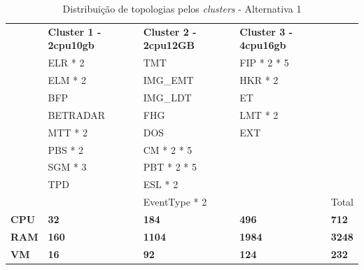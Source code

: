 \begin{table}[h!]
  \centering
  \begin{tabular}{|l|l|l|l|l|}
    \hline
    \rowcolor[HTML]{FBE6A3} 
    \multicolumn{5}{|c|}{\textbf{Alternativa 1}} \\ \hline
    \rowcolor[HTML]{4EAC5B} 
    \cellcolor{white} & \textbf{Cluster 1 - 2cpu10gb} & \textbf{Cluster 2 - 2cpu12GB} & \textbf{Cluster 3 - 4cpu16gb} & \cellcolor{white} \\ \hline
    \cellcolor{white} & \cellcolor[HTML]{A9D08E} ELR * 2 & \cellcolor[HTML]{BDD7EE} TMT  & \cellcolor[HTML]{A9D08E} FIP * 2 * 5 & \cellcolor{white} \\ \hline
    \cellcolor{white} & \cellcolor[HTML]{A9D08E} ELM * 2 & \cellcolor[HTML]{BDD7EE} IMG\_EMT  & \cellcolor[HTML]{A9D08E} HKR * 2 & \cellcolor{white} \\ \hline
    \cellcolor{white} & \cellcolor[HTML]{A9D08E} BFP & \cellcolor[HTML]{BDD7EE} IMG\_LDT  & \cellcolor[HTML]{BDD7EE} ET & \cellcolor{white} \\ \hline
    \cellcolor{white} & \cellcolor[HTML]{A9D08E} BETRADAR & \cellcolor[HTML]{BDD7EE} FHG  & \cellcolor[HTML]{BDD7EE} LMT * 2 & \cellcolor{white} \\ \hline
    \cellcolor{white} & \cellcolor[HTML]{BDD7EE} MTT * 2 & \cellcolor[HTML]{BDD7EE} DOS  & \cellcolor[HTML]{BDD7EE} EXT & \cellcolor{white} \\ \hline
    \cellcolor{white} & \cellcolor[HTML]{BDD7EE} PBS * 2 & \cellcolor[HTML]{BDD7EE} CM * 2 * 5  & \cellcolor{white} & \cellcolor{white} \\ \hline
    \cellcolor{white} & \cellcolor[HTML]{BDD7EE} SGM * 3 & \cellcolor[HTML]{A9D08E} PBT * 2 * 5  & \cellcolor{white} & \cellcolor{white} \\ \hline
    \cellcolor{white} & \cellcolor[HTML]{BDD7EE} TPD & \cellcolor[HTML]{A9D08E} ESL * 2 & \cellcolor{white} & \cellcolor{white} \\ \hline
    \cellcolor{white} & \cellcolor{white} & \cellcolor[HTML]{A9D08E} EventType * 2 & \cellcolor{white} & Total \cellcolor{white} \\ \hline

    \rowcolor[HTML]{D9D9D9} 
    \textbf{CPU} & \textbf{32} & \textbf{184} & \textbf{496} & \textbf{712} \\ \hline
    \rowcolor[HTML]{D9D9D9} 
    \textbf{RAM} & \textbf{160} & \textbf{1104} & \textbf{1984} & \textbf{3248} \\ \hline
    \rowcolor[HTML]{D9D9D9} 
    \textbf{VM} & \textbf{16} & \textbf{92} & \textbf{124} & \textbf{232} \\ \hline
  \end{tabular}
  \caption{Distribuição de topologias pelos \textit{clusters} - Alternativa 1}
  \label{tab:proposal-1}
\end{table}

